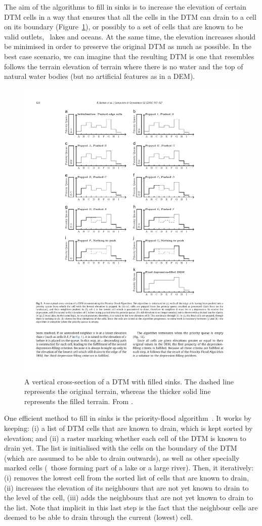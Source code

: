 The aim of the algorithms to fill in sinks is to increase the elevation of certain DTM cells in a way that ensures that all the cells in the DTM can drain to a cell on its boundary (Figure~\ref{fig:pf}), or possibly to a set of cells that are known to be valid outlets, \eg\ lakes and oceans\@.
At the same time, the elevation increases should be minimised in order to preserve the original DTM as much as possible.
In the best case scenario, we can imagine that the resulting DTM is one that resembles follows the terrain elevation of terrain where there is no water and the top of natural water bodies (but no artificial features as in a DEM).

\begin{figure}[htbp]
\centering
\includegraphics[width=0.8\linewidth]{figs/pf.pdf}
\caption{A vertical cross-section of a DTM with filled sinks. The dashed line represents the original terrain, whereas the thicker solid line represents the filled terrain. From \citet{Barnes14a}.}%
\label{fig:pf}
\end{figure}

One efficient method to fill in sinks is the priority-flood algorithm~\citep{Barnes14a}.
It works by keeping: (i) a list of DTM cells that are known to drain, which is kept sorted by elevation; and (ii) a raster marking whether each cell of the DTM is known to drain yet.
The list is initialised with the cells on the boundary of the DTM (which are assumed to be able to drain outwards), as well as other specially marked cells (\eg\ those forming part of a lake or a large river)\@.
Then, it iteratively: (i) removes the lowest cell from the sorted list of cells that are known to drain, (ii) increases the elevation of its neighbours that are not yet known to drain to the level of the cell, (iii) adds the neighbours that are not yet known to drain to the list.
Note that implicit in this last step is the fact that the neighbour cells are deemed to be able to drain through the current (lowest) cell.

